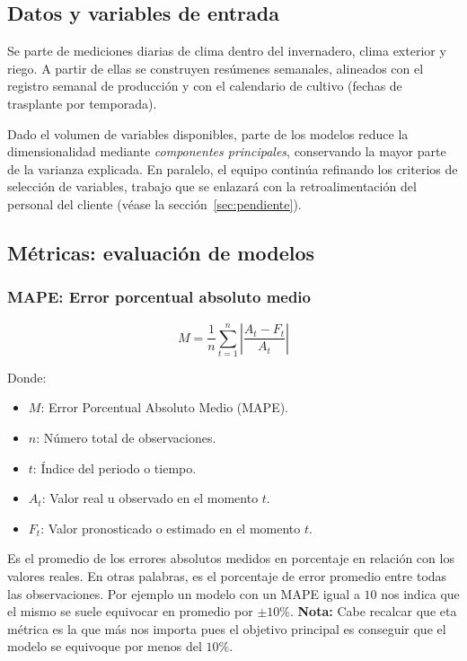\documentclass[11pt,a4paper]{article}
\begin{document}
\subsection{Datos y variables de entrada}

Se parte de mediciones diarias de clima dentro del invernadero, clima exterior y riego. A partir de ellas se construyen resúmenes semanales, alineados con el registro semanal de producción y con el calendario de cultivo (fechas de trasplante por temporada).

Dado el volumen de variables disponibles, parte de los modelos reduce la dimensionalidad mediante \emph{componentes principales}, conservando la mayor parte de la varianza explicada. En paralelo, el equipo continúa refinando los criterios de selección de variables, trabajo que se enlazará con la retroalimentación del personal del cliente (véase la sección~\ref{sec:pendiente}).

\subsection{Métricas: evaluación de modelos}

\subsubsection*{MAPE: Error porcentual absoluto medio}

\begin{equation}
  M = \frac{1}{n} \sum_{t=1}^{n} \left| \frac{A_t - F_t}{A_t} \right|
\end{equation}

Donde:
\begin{itemize}
    \item $M$: Error Porcentual Absoluto Medio (MAPE).
    \item $n$: Número total de observaciones.
    \item $t$: Índice del periodo o tiempo.
    \item $A_t$: Valor real u observado en el momento $t$.
    \item $F_t$: Valor pronosticado o estimado en el momento $t$.
\end{itemize}

Es el promedio de los errores absolutos medidos en porcentaje en relación con los valores reales. En otras palabras, es el porcentaje de error promedio entre todas las observaciones. Por ejemplo un modelo con un MAPE igual a $10$ nos indica que el mismo se suele equivocar en promedio por $\pm 10\%$. \textbf{Nota:} Cabe recalcar que eta métrica es la que más nos importa pues el objetivo principal es conseguir que el modelo se equivoque por menos del $10\%$.
\end{document}
